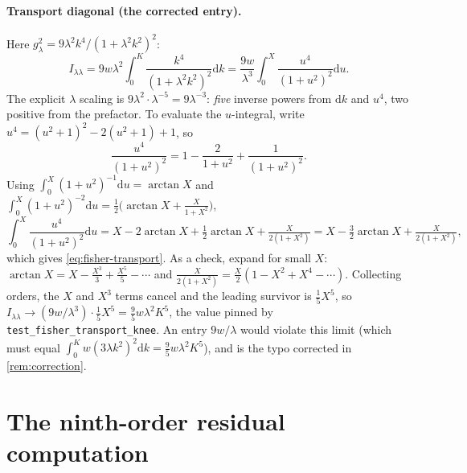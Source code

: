 \documentclass[11pt]{article}
\newcommand{\dd}{\mathrm{d}}
\begin{document}
\paragraph{Transport diagonal (the corrected entry).} Here \(g_\lambda^2=9\lambda^2k^4/(1+\lambda^2k^2)^2\):
\begin{equation}
I_{\lambda\lambda}=9w\lambda^2\!\int_0^K\!\frac{k^4}{(1+\lambda^2k^2)^2}\dd k
=\frac{9w}{\lambda^3}\!\int_0^X\!\frac{u^4}{(1+u^2)^2}\dd u.
\label{eq:appB-ll1}
\end{equation}
The explicit \(\lambda\) scaling is \(9\lambda^2\cdot\lambda^{-5}=9\lambda^{-3}\): \emph{five} inverse powers from \(\dd k\) and \(u^4\), two positive from the prefactor. To evaluate the \(u\)-integral, write \(u^4=(u^2+1)^2-2(u^2+1)+1\), so
\begin{equation}
\frac{u^4}{(1+u^2)^2}=1-\frac{2}{1+u^2}+\frac{1}{(1+u^2)^2}.
\label{eq:appB-split}
\end{equation}
Using \(\int_0^X(1+u^2)^{-1}\dd u=\arctan X\) and \(\int_0^X(1+u^2)^{-2}\dd u=\tfrac12\big(\arctan X+\tfrac{X}{1+X^2}\big)\),
\begin{equation}
\int_0^X\frac{u^4}{(1+u^2)^2}\dd u
=X-2\arctan X+\tfrac12\arctan X+\tfrac{X}{2(1+X^2)}
=X-\tfrac32\arctan X+\tfrac{X}{2(1+X^2)},
\label{eq:appB-ll2}
\end{equation}
which gives \eqref{eq:fisher-transport}. As a check, expand for small \(X\): \(\arctan X=X-\tfrac{X^3}{3}+\tfrac{X^5}{5}-\cdots\) and \(\tfrac{X}{2(1+X^2)}=\tfrac{X}{2}(1-X^2+X^4-\cdots)\). Collecting orders, the \(X\) and \(X^3\) terms cancel and the leading survivor is \(\tfrac15 X^5\), so \(I_{\lambda\lambda}\to(9w/\lambda^3)\cdot\tfrac15 X^5=\tfrac95 w\lambda^2K^5\), the value pinned by \texttt{test\_fisher\_transport\_knee}. An entry \(9w/\lambda\) would violate this limit (which must equal \(\int_0^K w(3\lambda k^2)^2\dd k=\tfrac95 w\lambda^2K^5\)), and is the typo corrected in \cref{rem:correction}.

\section{The ninth-order residual computation}
\label{app:k9}
\end{document}
